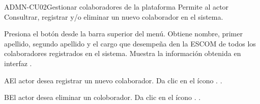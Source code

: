 \begin{UseCase}{ADMN-CU02}{Gestionar colaboradores de la plataforma}{
	Permite al actor Consultrar, registrar y/o eliminar un nuevo colaborador en el sistema.
}
	  

\end{UseCase}

\begin{UCtrayectoria}
	\UCpaso [\UCactor] Presiona el botón  desde la barra superior del menú.
	\UCpaso [\UCsist] Obtiene nombre, primer apellido, segundo apellido y el cargo que desempeña den la ESCOM de todos los colaboradores registrados en el sistema. 
    \UCpaso [\UCsist] Muestra la información obtenida en interfaz .
	
\end{UCtrayectoria}

\begin{UCtrayectoriaA}{A}{El actor desea registrar un nuevo colaborador.}
	\UCpaso [\UCactor] Da clic en el ícono \IUAgregar{}.
	.
\end{UCtrayectoriaA} 

\begin{UCtrayectoriaA}{B}{El actor desea eliminar un coloborador.}
	\UCpaso [\UCactor] Da clic en el ícono \IUEliminar{}.
	.
\end{UCtrayectoriaA} 
